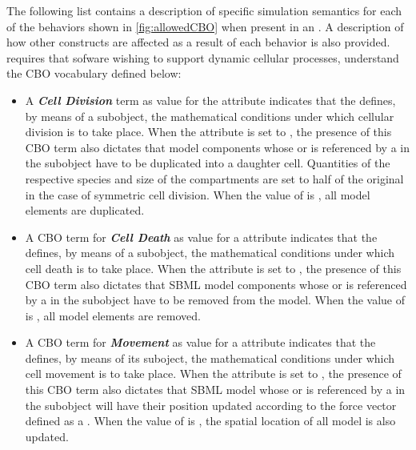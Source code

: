 The following list contains a description of specific simulation semantics for each of the behaviors shown in \ref{fig:allowedCBO} when present in an \Event. A description of how other constructs are affected as a result of each behavior is also provided. \sbmlthreedynamic requires that sofware wishing to support dynamic cellular processes, understand the CBO vocabulary defined below: 


\begin{itemize}
	\item A \textbf{\textit{Cell Division}} term as value for the  attribute indicates that the \Event defines, by means of a \Trigger subobject, the mathematical conditions under which cellular division is to take place. When the  \Event attribute is set to , the presence of this CBO term also dictates that model components whose  or  is referenced by a \DynElement in the \ListOfDynElements subobject have to be duplicated into a daughter cell. Quantities of the respective species and size of the compartments are set to half of the original in the case of symmetric cell division. When the value of  is , all model elements are duplicated. 
	
	\item A CBO term for \textbf{\textit{Cell Death}} as value for a  attribute indicates that the \Event defines, by means of a \Trigger subobject, the mathematical conditions under which cell death is to take place. When the  \Event attribute is set to , the presence of this CBO term also dictates that SBML model components whose  or  is referenced by a \DynElement in the \ListOfDynElements subobject have to be removed from the model. When the value of  is , all model elements are removed. 	
	
	\item A CBO term for \textbf{\textit{Movement}} as value for a  attribute indicates that the \Event defines, by means of its \Trigger suboject, the mathematical conditions under which cell movement is to take place. When the  \Event attribute is set to , the presence of this CBO term also dictates that SBML model \Compartments whose  or  is referenced by a \DynElement in the \ListOfDynElements subobject will have their position updated according to the force vector defined as a \SpatialComponent. When the value of  is , the spatial location of all model \Compartments is also updated.

\end{itemize}


